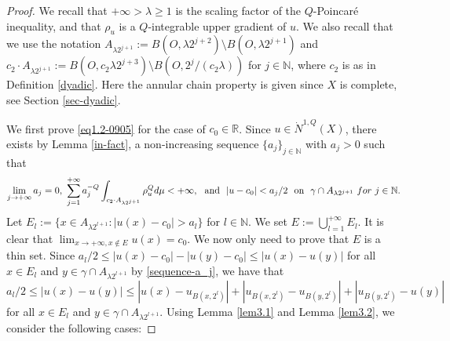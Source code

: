 \documentclass[10pt]{amsart}
\numberwithin{equation}{section}
\begin{document}
\begin{proof}


We recall that  $+\infty>\lambda\geq 1$ is
the scaling factor of the $Q$-Poincar\'e inequality, and that  $\rho_u$ is  a $Q$-integrable upper gradient of $u$. We also recall that we use the notation $A_{\lambda 2^{j+1}}:=B(O,\lambda2^{j+2})\setminus B(O,\lambda2^{j+1})$ and $c_2\cdot A_{\lambda 2^{j+1}}:=B(O,c_2\lambda 2^{j+3})\setminus B(O,2^{j}/(c_2\lambda))$ for $j\in\mathbb N$, where   $c_2$ is as in Definition \ref{dyadic}.  Here the annular chain property  is given since $X$ is complete, see Section \ref{sec-dyadic}.

We first prove \eqref{eq1.2-0905} for the case of $c_0\in\mathbb R$.
Since $u\in\dot N^{1,Q}(X)$, there exists by Lemma \ref{in-fact}, a non-increasing sequence $\{a_j\}_{j\in\mathbb N}$ with $a_j>0$ such that 
\begin{equation}
\label{sequence-a_j}\lim_{j\to{+\infty}}a_j=0,\ \sum_{j=1}^{+\infty} a_j^{-Q}\int_{c_2\cdot A_{\lambda 2^{j+1}}}\rho_u^Qd\mu<{+\infty}, \text{\rm \ \ and\ \ } |u-c_0|<a_j/2 \text{\rm \ \ on \ }{ \gamma\cap A_{\lambda 2^{j+1}}}\ {\rm for\ }j\in\mathbb N.
\end{equation}
Let $E_l:=\{ x\in A_{\lambda 2^{l+1}}: |u(x)-c_0|>a_l\}$ for $l\in\mathbb N$.  We set $E:=\bigcup_{l=1}^{+\infty} E_l$. It is clear that $\lim_{x\to{+\infty}, x\notin E}u(x)=c_0$. We now only need to prove that $E$ is a thin set. Since $a_l/2\leq |u(x)-c_0| - |u(y)-c_0|\leq |u(x)-u(y)|$ for all $x\in E_l$ and $y\in  \gamma\cap A_{\lambda 2^{l+1}}$ by \eqref{sequence-a_j}, we have that
	\begin{equation}\label{eq3.9-1207}
 a_l/2\leq |u(x)-u(y)| \leq | u(x)-u_{B(x,2^l)}|+|u_{B(x,2^l)}-u_{B(y,2^l)}|+|u_{B(y,2^l)}-u(y)|
 	\end{equation}
  for all $x\in E_l$ and $y\in  \gamma\cap A_{\lambda 2^{l+1}}$.
Using Lemma \ref{lem3.1} and Lemma \ref{lem3.2}, we consider the following cases:


\end{proof}
\end{document}
